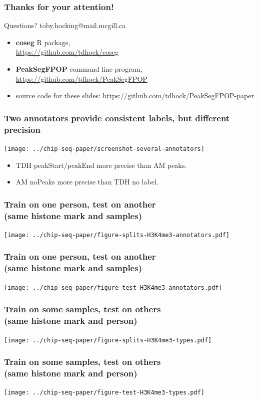 \documentclass{beamer}
\begin{document}
\begin{frame}
  \frametitle{Thanks for your attention!}

  Questions? toby.hocking@mail.mcgill.ca
  \begin{itemize}
  \item 
  \textbf{coseg} R package, \\
  \url{https://github.com/tdhock/coseg}
  \item 
    \textbf{PeakSegFPOP} command line program, 
  \url{https://github.com/tdhock/PeakSegFPOP}
  \item source code for these slides:
  \url{https://github.com/tdhock/PeakSegFPOP-paper}
  \end{itemize}
\end{frame}

\begin{frame}
  \frametitle{Two annotators provide consistent labels, but different
    precision}
  \texttt{[image: ../chip-seq-paper/screenshot-several-annotators]}

  \begin{itemize}
  \item TDH peakStart/peakEnd more precise than AM peaks.
  \item AM noPeaks more precise than TDH no label.
  \end{itemize}
\end{frame}

\begin{frame}
  \frametitle{Train on one person, test on another\\
(same histone mark and samples)}
  \texttt{[image: ../chip-seq-paper/figure-splits-H3K4me3-annotators.pdf]}
\end{frame}

\begin{frame}
  \frametitle{Train on one person, test on another\\
(same histone mark and samples)}
  \texttt{[image: ../chip-seq-paper/figure-test-H3K4me3-annotators.pdf]}
\end{frame}

\begin{frame}
  \frametitle{Train on some samples, test on others\\
(same histone mark and person)}
  \texttt{[image: ../chip-seq-paper/figure-splits-H3K4me3-types.pdf]}
\end{frame}

\begin{frame}
  \frametitle{Train on some samples, test on others\\
(same histone mark and person)}
  \texttt{[image: ../chip-seq-paper/figure-test-H3K4me3-types.pdf]}
\end{frame}
\end{document}
